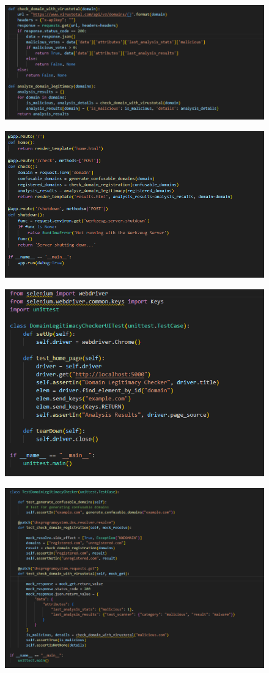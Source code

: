 \begin{figure}[h]
    \centering
    \includegraphics[width=0.8\linewidth]{appendix/a8.png}
    \label{fig:enter-label}
\end{figure}

\begin{figure}[h]
    \centering
    \includegraphics[width=0.8\linewidth]{appendix/a9.png}
    \label{fig:enter-label}
\end{figure}

\begin{figure}[h]
    \centering
    \includegraphics[width=0.8\linewidth]{appendix/a10.png}
    \label{fig:enter-label}
\end{figure}

\begin{figure}[h]
    \centering
    \includegraphics[width=0.8\linewidth]{appendix/a11.png}
    \label{fig:enter-label}
\end{figure}